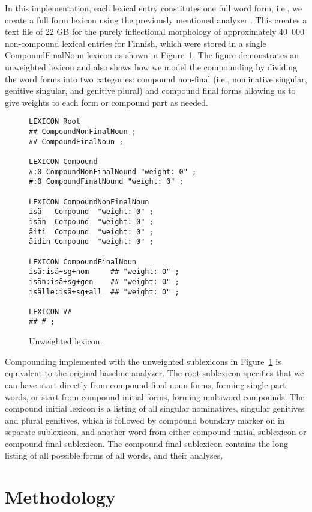 \documentclass[11pt]{article}
\begin{document}
In this implementation, each lexical entry constitutes one full word
form, i.e., we create a full form lexicon using the previously
mentioned analyzer \cite{pirinen/2008}. This creates a text file of 22
GB for the purely inflectional morphology of approximately 40~000
non-compound lexical entries for Finnish, which were stored in a
single CompoundFinalNoun lexicon as shown in
Figure~\ref{fig:unweighted}. The figure demonstrates an unweighted
lexicon and also shows how we model the compounding by dividing the
word forms into two categories: compound non-final (i.e., nominative
singular, genitive singular, and genitive plural) and compound final
forms allowing us to give weights to each form or compound part as
needed.

\begin{figure}[htb]
\begin{small}
\begin{verbatim}
LEXICON Root
## CompoundNonFinalNoun ;
## CompoundFinalNoun ;

LEXICON Compound
#:0 CompoundNonFinalNound "weight: 0" ;
#:0 CompoundFinalNound "weight: 0" ;

LEXICON CompoundNonFinalNoun
isä   Compound  "weight: 0" ;
isän  Compound  "weight: 0" ;
äiti  Compound  "weight: 0" ;
äidin Compound  "weight: 0" ;

LEXICON CompoundFinalNoun
isä:isä+sg+nom     ## "weight: 0" ;
isän:isä+sg+gen    ## "weight: 0" ;
isälle:isä+sg+all  ## "weight: 0" ;

LEXICON ##
## # ;
\end{verbatim}
\caption{Unweighted lexicon.
}\label{fig:unweighted}
\end{small}
\end{figure}

Compounding implemented with the unweighted sublexicons in
Figure~\ref{fig:unweighted} is equivalent to the original baseline
analyzer. The root sublexicon specifies that we can have start directly
from compound final noun forms, forming single part words, or start from
compound initial forms, forming multiword compounds. The compound initial
lexicon is a listing of all singular nominatives, singular genitives and
plural genitives, which is followed by compound boundary marker on in separate
sublexicon, and another word from either compound initial sublexicon or compound
final sublexicon. The compound final sublexicon contains the long listing of all
possible forms of all words, and their analyses, 

\section{Methodology}  
\label{Sect3}
\end{document}
